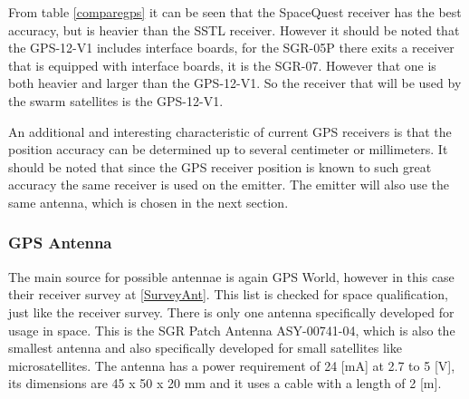 From table \ref{comparegps} it can be seen that the SpaceQuest receiver has the best accuracy, but is heavier than the \acs{SSTL} receiver. However it should be noted that the GPS-12-V1 includes interface boards, for the SGR-05P there exits a receiver that is equipped with interface boards, it is the SGR-07. However that one is both heavier and larger than the GPS-12-V1. So the receiver that will be used by the swarm satellites is the GPS-12-V1.

An additional and interesting characteristic of current \acs{GPS} receivers is that the position accuracy can be determined up to several centimeter or millimeters. It should be noted that since the \acs{GPS} receiver position is known to such great accuracy the same receiver is used on the emitter. The emitter will also use the same antenna, which is chosen in the next section.

\subsubsection{GPS Antenna}
The main source for possible antennae is again GPS World, however in this case their receiver survey at \ref{SurveyAnt}. This list is checked for space qualification, just like the receiver survey. There is only one antenna specifically developed for usage in space. This is the SGR Patch Antenna ASY-00741-04, which is also the smallest antenna and also specifically developed for small satellites like microsatellites.
The antenna has a power requirement of 24 [mA] at 2.7 to 5 [V], its dimensions are 45 x 50 x 20 mm and it uses a cable with a length of 2 [m].